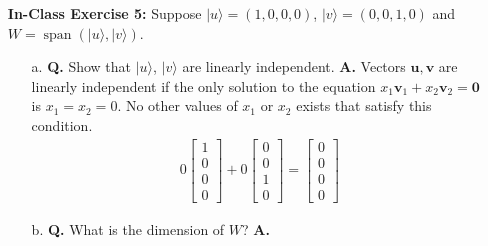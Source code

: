 \documentclass[main.tex]{subfiles}
\begin{document}
\begin{enumerate}
\begin{enumerate}
    \end{enumerate}

\item[] \textbf{In-Class Exercise 5:} Suppose $|u\rangle=(1,0,0,0)$, $|v\rangle=(0,0,1,0)$ and $W=\operatorname{span}(|u\rangle,|v\rangle)$.

    \begin{enumerate}
        \item[a.] \textbf{Q.} Show that $|u\rangle$, $|v\rangle$ are linearly independent. \textbf{A.} Vectors $\mathbf{u}, \mathbf{v}$ are linearly independent if the only solution to the equation $x_{1} \mathbf{v}_{1}+x_{2} \mathbf{v}_{2}=\mathbf{0}$ is $x_{1}=x_{2}=0$. No other values of $x_1$ or $x_2$ exists that satisfy this condition.
        \begin{align*}
            0 \left[\begin{array}{l} 1 \\ 0 \\ 0 \\ 0 \end{array}\right] + 0 \left[\begin{array}{l} 0 \\ 0 \\ 1 \\ 0 \end{array}\right] = \left[\begin{array}{l} 0 \\ 0 \\ 0 \\ 0 \end{array}\right]
        \end{align*}
        
        
        \item[b.] \textbf{Q.} What is the dimension of $W$? \textbf{A.} 
        

\end{enumerate}
\end{enumerate}
\end{document}
